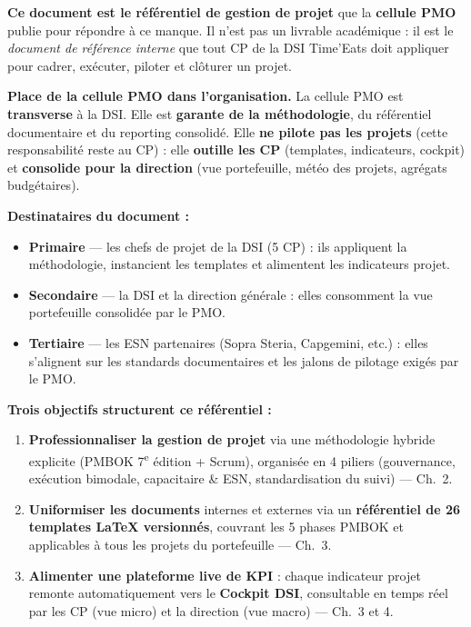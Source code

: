 \documentclass[11pt,a4paper,oneside]{report}
\begin{document}
\textbf{Ce document est le référentiel de gestion de projet} que la \textbf{cellule PMO} publie pour répondre à ce manque. Il n'est pas un livrable académique : il est le \textit{document de référence interne} que tout CP de la DSI Time'Eats doit appliquer pour cadrer, exécuter, piloter et clôturer un projet.

\begin{finding}
\textbf{Place de la cellule PMO dans l'organisation.} La cellule PMO est \textbf{transverse} à la DSI. Elle est \textbf{garante de la méthodologie}, du référentiel documentaire et du reporting consolidé. Elle \textbf{ne pilote pas les projets} (cette responsabilité reste au CP) : elle \textbf{outille les CP} (templates, indicateurs, cockpit) et \textbf{consolide pour la direction} (vue portefeuille, météo des projets, agrégats budgétaires).
\end{finding}

\textbf{Destinataires du document :}
\begin{itemize}
  \item \textbf{Primaire} --- les chefs de projet de la DSI (5 CP) : ils appliquent la méthodologie, instancient les templates et alimentent les indicateurs projet.
  \item \textbf{Secondaire} --- la DSI et la direction générale : elles consomment la vue portefeuille consolidée par le PMO.
  \item \textbf{Tertiaire} --- les ESN partenaires (Sopra Steria, Capgemini, etc.) : elles s'alignent sur les standards documentaires et les jalons de pilotage exigés par le PMO.
\end{itemize}

\textbf{Trois objectifs structurent ce référentiel :}
\begin{enumerate}
  \item \textbf{Professionnaliser la gestion de projet} via une méthodologie hybride explicite (PMBOK 7\textsuperscript{e} édition + Scrum), organisée en 4 piliers (gouvernance, exécution bimodale, capacitaire \& ESN, standardisation du suivi) --- Ch.\ 2.
  \item \textbf{Uniformiser les documents} internes et externes via un \textbf{référentiel de 26 templates LaTeX versionnés}, couvrant les 5 phases PMBOK et applicables à tous les projets du portefeuille --- Ch.\ 3.
  \item \textbf{Alimenter une plateforme live de KPI} : chaque indicateur projet remonte automatiquement vers le \textbf{Cockpit DSI}, consultable en temps réel par les CP (vue micro) et la direction (vue macro) --- Ch.\ 3 et 4.
\end{enumerate}
\end{document}
